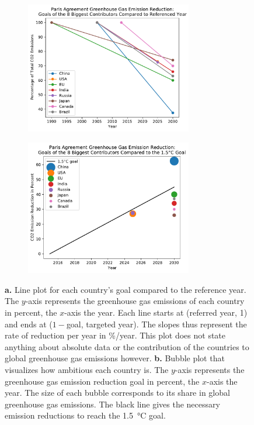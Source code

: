 \begin{figure}[htb]
	\begin{center}
		\begin{subfigure}[b]{0.49\linewidth}
			\centering
			\includegraphics[width=0.8\textwidth]{co2goals/co2goals_lines.pdf}
			\caption{}
			\label{fig:co2goals_line}
		\end{subfigure}\hfill
		\begin{subfigure}[b]{0.49\linewidth}
			\centering
			\includegraphics[width=0.8\textwidth]{co2goals/co2goals_bubbles.pdf}
			\caption{}
			\label{fig:co2goals_bubble}
		\end{subfigure}
		\caption{\textbf{a.} Line plot for each country's goal compared to the reference year. The $y$-axis represents the greenhouse gas emissions of each country in percent, the $x$-axis the year. Each line starts at (referred  year, 1) and ends at (\(1-\)goal, targeted year). The slopes thus represent the rate of reduction per year in \%/year. This plot does not state anything about absolute data or the contribution of the countries to global greenhouse gas emissions however.
			\textbf{b.}	Bubble plot that visualizes how ambitious each country is. The $y$-axis represents the greenhouse gas emission reduction goal in percent, the $x$-axis the year. The size of each bubble corresponds to its share in global greenhouse gas emissions. The black line gives the necessary emission reductions to reach the \SI{1.5}{\degreeCelsius} goal.}
	\end{center}
\end{figure}
